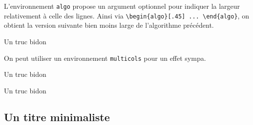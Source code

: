 \documentclass[12pt,a4paper]{article}
\theoremstyle{definition}
\begin{document}
\medskip


L'environnement \verb+algo+ propose un argument optionnel pour indiquer la largeur relativement à celle des lignes.
Ainsi  via \verb+\begin{algo}[.45] ... \end{algo}+, on obtient la version suivante bien moins large de l'algorithme précédent.

\begin{algo}[.45]
    \caption{Un truc bidon}

    \addalgoblank

\end{algo} 


\medskip


On peut utiliser un environnement \verb+multicols+ pour un effet sympa.

\begin{multicols}{2}    
\begin{algo}
    \caption{Un truc bidon}

    \addalgoblank
\end{algo}


\begin{algo}
    \caption{Un truc bidon}

    \addalgoblank
\end{algo}
\end{multicols}





\subsection{Un titre minimaliste}
\end{document}
